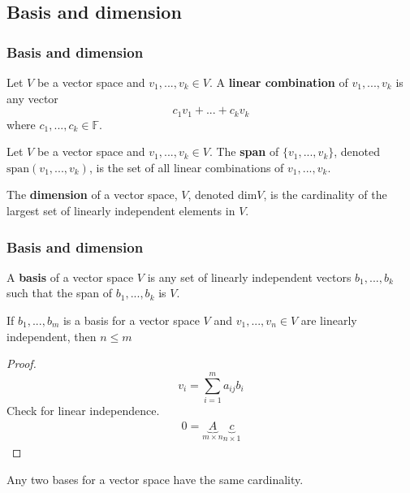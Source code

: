 \documentclass[compress]{beamer}
\def\F{\mathbb{F}}
\newcommand{\spn}{\mathrm{span}}
\renewcommand{\dim}{\mathrm{dim}}
\begin{document}
\subsection{Basis and dimension}
\begin{frame}\frametitle{Basis and dimension}
  \begin{definition}
    Let $V$ be a vector space and $v_1,..., v_k \in V$. A \textbf{linear
      combination} of $v_1,..., v_k$ is any vector 
    \[c_1 v_1 + ... + c_k v_k \]
    where $c_1, ..., c_k \in \F$. 
  \end{definition}

  \begin{definition}
    Let $V$ be a vector space and $v_1,..., v_k \in V$. The
    \textbf{span} of $\{ v_1, ... , v_k \}$, denoted
    $\spn(v_1,...,v_k)$, is the set of all linear combinations of
    $v_1, ... , v_k$.
  \end{definition}

  \begin{definition}
    The \textbf{dimension} of a vector space, $V$, denoted $\dim V$, is
    the cardinality of the largest set of linearly independent elements
    in $V$.
  \end{definition} 
\end{frame}

\begin{frame}\frametitle{Basis and dimension}
  \begin{definition}
    A \textbf{basis} of a vector space $V$ is any set of linearly
    independent vectors $b_1, ..., b_k$ such that the span of $b_1, ...,
    b_k$ is $V$.
  \end{definition}

  \begin{lemma}
    If $b_1,..., b_m$ is a basis for a vector space $V$ and $v_1, ...,
    v_n\in V$ are linearly independent, then $n \leq m$
  \end{lemma}

  \begin{proof}
    \[ v_i = \sum_{i=1}^m a_{ij} b_i \]
    Check for linear independence.
    \begin{align*}
      0 = \underbrace{A}_{m \times n} \underbrace{c}_{n \times 1}    
    \end{align*}
  \end{proof}

  \begin{corollary}
    Any two bases for a vector space have the same cardinality.
  \end{corollary}
\end{frame}
\end{document}
